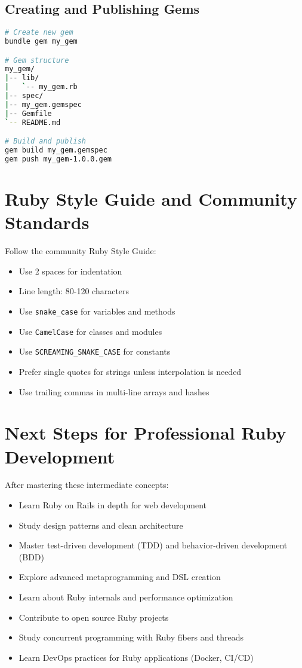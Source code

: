 \documentclass[12pt,a4paper]{article}
\begin{document}
\subsection{Creating and Publishing Gems}

\begin{lstlisting}[language=bash]
# Create new gem
bundle gem my_gem

# Gem structure
my_gem/
|-- lib/
|   `-- my_gem.rb
|-- spec/
|-- my_gem.gemspec
|-- Gemfile
`-- README.md

# Build and publish
gem build my_gem.gemspec
gem push my_gem-1.0.0.gem
\end{lstlisting}

\section{Ruby Style Guide and Community Standards}

Follow the community Ruby Style Guide:

\begin{itemize}
    \item Use 2 spaces for indentation
    \item Line length: 80-120 characters
    \item Use \texttt{snake\_case} for variables and methods
    \item Use \texttt{CamelCase} for classes and modules
    \item Use \texttt{SCREAMING\_SNAKE\_CASE} for constants
    \item Prefer single quotes for strings unless interpolation is needed
    \item Use trailing commas in multi-line arrays and hashes
\end{itemize}

\section{Next Steps for Professional Ruby Development}

After mastering these intermediate concepts:

\begin{itemize}
    \item Learn Ruby on Rails in depth for web development
    \item Study design patterns and clean architecture
    \item Master test-driven development (TDD) and behavior-driven development (BDD)
    \item Explore advanced metaprogramming and DSL creation
    \item Learn about Ruby internals and performance optimization
    \item Contribute to open source Ruby projects
    \item Study concurrent programming with Ruby fibers and threads
    \item Learn DevOps practices for Ruby applications (Docker, CI/CD)
\end{itemize}
\end{document}
